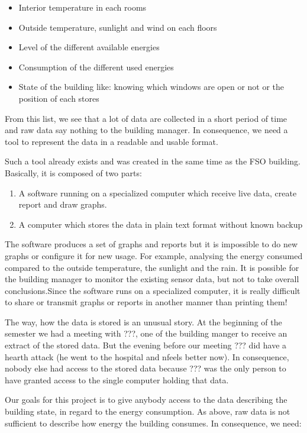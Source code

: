 \documentclass{acm_proc_article-sp}
\begin{document}
\begin{itemize}
\item Interior temperature in each rooms
\item Outside temperature, sunlight and wind on each floors
\item Level of the different available energies
\item Consumption of the different used energies
\item State of the building like: knowing which windows are open or not or the position of each stores
\end{itemize}
 
From this list, we see that a lot of data are collected in a short period of time and raw data say nothing to the building manager. In consequence, we need a tool to represent the data in a readable and usable format.

Such a tool already exists and was created in the same time as the FSO building. Basically, it is composed of two parts: 

\begin{enumerate}
\item A software running on a specialized computer which receive live data, create report and draw graphs.
\item A computer which stores the data in plain text format without known backup
\end{enumerate}

The software produces a set of graphs and reports but it is impossible to do new graphs or configure it for new usage. For example, analysing the energy consumed compared to the outside temperature, the sunlight and the rain. It is possible for the building manager to monitor the existing sensor data, but not to take overall conclusions.Since the software runs on a specialized computer, it is really difficult to share or transmit graphs or reports in another manner than printing them!


The way, how the data is stored is an unusual story. At the beginning of the semester we had a meeting with  ???, one of the building manger to receive an extract of the stored data. But the evening before our meeting ??? did have a hearth attack (he went to the hospital and nfeels better now). In consequence, nobody else had access to the stored data because ??? was the only person to have granted access to the single computer holding that data.

Our goals for this project is to give anybody access to the data describing the building state, in regard to the energy consumption. As above, raw data is not sufficient to describe how energy the building consumes. In consequence, we need:
\end{document}

